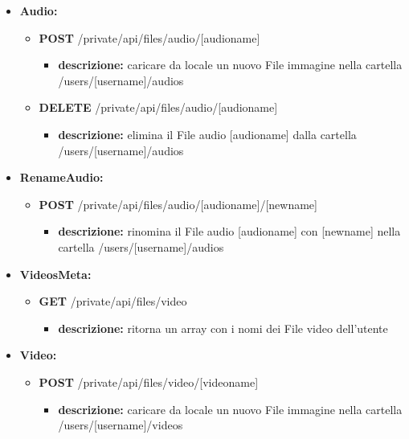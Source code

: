 {{\begin{itemize}
		\item \textbf{Audio:}
			\begin{itemize}
			\item    \textbf{POST} /private/api/files/audio/[audioname]
				\begin{itemize} 
				\item \textbf{descrizione:} caricare da locale un nuovo File immagine nella cartella /users/[username]/audios					

				\end{itemize}
			\item   \textbf{DELETE} /private/api/files/audio/[audioname]
				\begin{itemize} 
				\item \textbf{descrizione:} elimina il File audio [audioname] dalla cartella /users/[username]/audios			

				\end{itemize}
			\end{itemize}
			
		\item \textbf{RenameAudio:}
			\begin{itemize}
			\item   \textbf{POST} /private/api/files/audio/[audioname]/[newname] 
				\begin{itemize} 
				\item \textbf{descrizione:} rinomina il File audio [audioname] con [newname] nella cartella /users/[username]/audios

				\end{itemize}
			\end{itemize}
						
		\item \textbf{VideosMeta:}
			\begin{itemize}
			\item   \textbf{GET} /private/api/files/video
				\begin{itemize} 
				\item \textbf{descrizione:} ritorna un array con i nomi dei File video dell'utente
	
				\end{itemize}
			\end{itemize}
			
		\item \textbf{Video:}
			\begin{itemize}
			
			\item    \textbf{POST} /private/api/files/video/[videoname]
				\begin{itemize} 
				\item \textbf{descrizione:} caricare da locale un nuovo File immagine nella cartella /users/[username]/videos					


\end{itemize}
\end{itemize}
\end{itemize}}}
